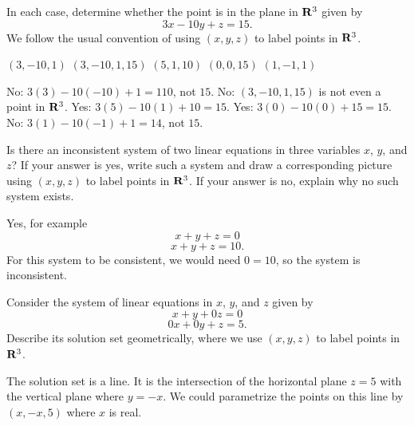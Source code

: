 \begin{problems}
  \problem In each case, determine whether the point is in the plane
  in ${\bf R}^3$ given by \[3x - 10y + z = 15.\] We follow the usual
  convention of using $(x, y, z)$ to label points in ${\bf R}^3$.
  \begin{subproblems}
    \subproblem $(3, -10, 1)$
    \subproblem $(3, -10, 1, 15)$
    \subproblem $(5, 1, 10)$
    \subproblem $(0, 0, 15)$
    \subproblem $(1, -1, 1)$
  \end{subproblems}
  \begin{solution}
    \begin{subproblems}
      \subproblem No: $3(3)-10(-10)+1 = 110$, not $15$. %
      \subproblem No: $(3, -10, 1, 15)$ is not even a point in
      ${\bf R}^3$. %
      \subproblem Yes: $3(5)-10(1)+10 = 15$. %
      \subproblem Yes: $3(0)-10(0)+15 = 15$. %
      \subproblem No: $3(1)-10(-1)+1 = 14$, not $15$.
    \end{subproblems}
  \end{solution}
  
  \problem Is there an inconsistent system of two linear equations in
  three variables $x$, $y$, and $z$?  If your answer is yes, write
  such a system and draw a corresponding picture using $(x, y, z)$ to
  label points in ${\bf R}^3$.  If your answer is no, explain why no
  such system exists. 
  \newline 
  \begin{solution}
    Yes, for example
    \[x + y + z = 0\]
    \[x + y + z = 10.\] %
    For this system to be consistent, we would need $0=10$, so the system
    is inconsistent. \newline \newline
  \end{solution}

  \problem Consider the system of linear equations in $x$, $y$, and
  $z$ given by
  \[x + y + 0z = 0\]
  \[0x + 0y + z = 5.\]
  Describe its solution set geometrically, where we use $(x, y, z)$
  to label points in ${\bf R}^3$.
  \begin{solution}
    The solution set is a line.  It is the intersection of the
    horizontal plane $z=5$ with the vertical plane where $y= -x$.  
    We could parametrize the points on this line by $(x, -x, 5)$ where
    $x$ is real.
  \end{solution}
  


\end{problems}
